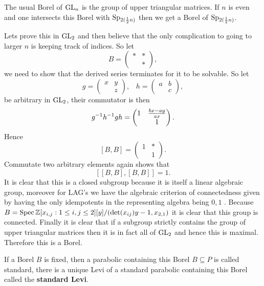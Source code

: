     \begin{example}
        The usual Borel of \(\operatorname{GL}_n\) is the group of upper triangular matrices. If \(n\) is even and one intersects this Borel with \(\operatorname{Sp}_{2(\frac{1}{2}n)}\) then we get a Borel of \(\operatorname{Sp}_{2(\frac{1}{2}n)}\).

        Lets prove this in \(\operatorname{GL}_2\) and then believe that the only complication to going to larger \(n\) is keeping track of indices. So let 
        \[B = \begin{pmatrix}
            \ast & \ast \\
             & \ast
        \end{pmatrix},\]
        we need to show that the derived series terminates for it to be solvable. So let 
        \[g = \begin{pmatrix}
            x & y\\
             & z
        \end{pmatrix}, \;\;\; h = \begin{pmatrix}
            a & b \\
            & c
        \end{pmatrix},\]
        be arbitrary in \(\operatorname{GL}_2\), their commutator is then 
        \[g^{-1} h^{-1} gh =  \begin{pmatrix}
            1 & \frac{bx - ay}{ax} \\ & 1
        \end{pmatrix} .\]
        Hence
        \[[B, B] = \begin{pmatrix}
            1 & \ast \\ & 1
        \end{pmatrix}.\]
        Commutate two arbitrary elements again shows that  
        \[[[B, B], [B, B]] = 1.\]
    It is clear that this is a closed subgroup because it is itself a linear algebraic group, moreover for LAG's we have the algebraic criterion of connectedness given by having the only idempotents in the representing algebra being \(0, 1\) \cite[1.5]{getzIntroductionAutomorphicRepresentations2024}. Because \(B = \Spec \Z[x_{i,j}: 1\leq i,j\leq 2][y] / (\det(x_{ij})y - 1, x_{2,1})\) it is clear that this group is connected.     
    Finally it is clear that if a subgroup strictly contains the group of upper triangular matrices then it is in fact all of \(\operatorname{GL}_2\) and hence this is maximal. Therefore this is a Borel.
    \end{example}

    If a Borel \(B\) is fixed, then a parabolic containing this Borel \(B\subseteq P\) is called standard, there is a unique Levi of a standard parabolic containing this Borel called the \textbf{standard Levi}.
    
